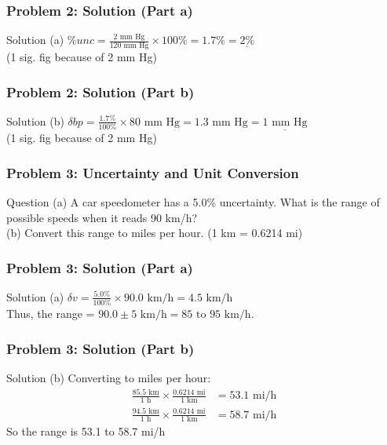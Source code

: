 \documentclass{beamer}
\begin{document}
\begin{frame}
\frametitle{Problem 2: Solution (Part a)}
\begin{block}{Solution}
(a) $\% unc = \frac{2 \text{ mm Hg}}{120 \text{ mm Hg}} \times 100\% = 1.7\% = \underline{2\%}$\\
(1 sig. fig because of 2 mm Hg)
\end{block}
\end{frame}

\begin{frame}
\frametitle{Problem 2: Solution (Part b)}
\begin{block}{Solution}
(b) $\delta bp = \frac{1.7\%}{100\%} \times 80 \text{ mm Hg} = 1.3 \text{ mm Hg} = \underline{1 \text{ mm Hg}}$\\
(1 sig. fig because of 2 mm Hg)
\end{block}
\end{frame}

\begin{frame}
\frametitle{Problem 3: Uncertainty and Unit Conversion}
\begin{block}{Question}
(a) A car speedometer has a 5.0\% uncertainty. What is the range of possible speeds when it reads 90 km/h?\\
(b) Convert this range to miles per hour. (1 km = 0.6214 mi)
\end{block}
\end{frame}

\begin{frame}
\frametitle{Problem 3: Solution (Part a)}
\begin{block}{Solution}
(a) $\delta v = \frac{5.0\%}{100\%} \times 90.0 \text{ km/h} = 4.5 \text{ km/h}$\\
Thus, the range = $90.0 \pm 5 \text{ km/h} = 85 \text{ to } 95 \text{ km/h}$.
\end{block}
\end{frame}

\begin{frame}
\frametitle{Problem 3: Solution (Part b)}
\begin{block}{Solution}
(b) Converting to miles per hour:
\begin{align*}
\frac{85.5 \text{ km}}{1 \text{ h}} \times \frac{0.6214 \text{ mi}}{1 \text{ km}} &= 53.1 \text{ mi/h}\\
\frac{94.5 \text{ km}}{1 \text{ h}} \times \frac{0.6214 \text{ mi}}{1 \text{ km}} &= 58.7 \text{ mi/h}
\end{align*}
So the range is 53.1 to 58.7 mi/h
\end{block}
\end{frame}
\end{document}
